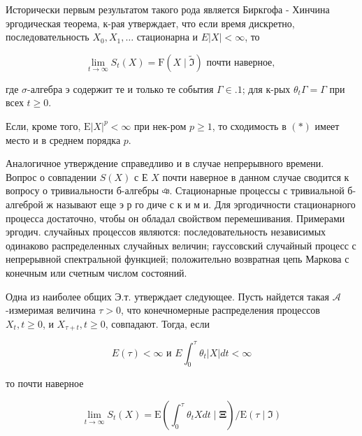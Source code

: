 \documentclass[10pt]{article}
\begin{document}
Исторически первым результатом такого рода является Биркгофа - Хинчина эргодическая теорема, к-рая утверждает, что если время дискретно, последовательность $X_{0}, X_{1}, \ldots$ стационарна и $E|X|<\infty$, то



\[

\lim _{t \rightarrow \infty} S_{t}(X)=\mathrm{F}(X \mid \widetilde{\Im}) \text { почти наверное, }

\]



где $\sigma$-алгебра э содержит те и только те события $\Gamma \in .1$; для к-рых $\theta_{t} \Gamma=\Gamma$ при всех $t \geqslant 0$.



Если, кроме того, $\mathrm{E}|X|^{p}<\infty$ при нек-ром $p \geqslant 1$, то сходимость в $(*)$ имеет место и в среднем порядка $p$.



Аналогичное утверждение справедливо и в случае непрерывного времени. Вопрос о совпадении $S(X)$ с Е $X$ почти наверное в данном случае сводится к вопросу о тривиальности б-алгебры ঞ. Стационарные процессы с тривиальной б-алгеброй ж называют еще э р го диче с к и м и. Для эргодичности стационарного процесса достаточно, чтобы он обладал свойством перемешивания. Примерами эргодич. случайных процессов являются: последовательность независимых одинаково распределенных случайных величин; гауссовский случайный процесс с непрерывной спектральной функцией; положительно возвратная цепь Маркова с конечным или счетным числом состояний.



Одна из наиболее общих Э.т. утверждает следующее. Пусть найдется такая $\mathcal{A}$-измеримая величина $\tau>0$, что конечномерные распределения процессов $X_{t}, t \geqslant 0$, и $X_{\tau+t}, t \geqslant 0$, совпадают. Тогда, если



\[

E(\tau)<\infty \text { и } E \int_{0}^{\tau} \theta_{t}|X| d t<\infty

\]



то почти наверное



\[

\lim _{t \rightarrow \infty} S_{t}(X)=\mathrm{E}\left(\int_{0}^{\tau} \theta_{t} X d t \mid \boldsymbol{\Xi}\right) / \mathrm{E}(\tau \mid \boldsymbol{\Im})

\]
\end{document}
